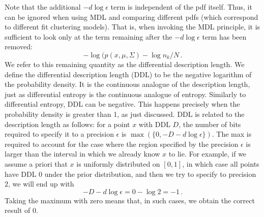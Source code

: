 \documentclass[a4paper,fleqn]{cas-sc}
\theoremstyle{remark}
\begin{document}
Note that the additional $-d\log{\epsilon}$ term is independent of the pdf itself. Thus, it can be ignored when using MDL and comparing different pdfs (which correspond to different fit clustering models). That is, when invoking the MDL principle, it is sufficient to look only at the term remaining after the $-d\log{\epsilon}$ term has been removed:
\begin{equation} \label{eq:MVN-DDL}
    -\log(p(x, \mu, \Sigma) - \log n_k/N \,.
\end{equation}
We refer to this remaining quantity as the differential description length. We define the differential description length (DDL) to be the negative logarithm of the probability density. It is the continuous analogue of the description length, just as differential entropy is the continuous analogue of entropy. Similarly to differential entropy, DDL can be negative. This happens precisely when the probability density is greater than 1, as just discussed. DDL is related to the description length as follows: for a point $x$ with DDL $D$, the number of bits required to specify it to a precision $\epsilon$ is $\max(\{0,-D - d\log{\epsilon\}})$. 
The max is required to account for the case where the region specified by the precision $\epsilon$ is larger than the interval in which we already know $x$ to lie. For example, if we assume a priori that $x$ is uniformly distributed on $[0,1]$, in which case all points have DDL $0$ under the prior distribution, and then we try to specify to precision $2$, we will end up with 
\[
-D - d\log{\epsilon} = 0 - \log{2} = -1 \,.
\]
Taking the maximum with zero means that, in such cases, we obtain the correct result of $0$.
\end{document}
